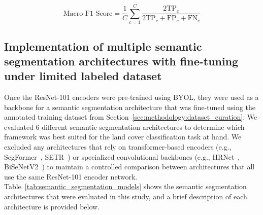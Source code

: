 \begin{equation}\label{eq:macro_f1}
    \text{Macro F1 Score} = \frac{1}{C} \sum_{c=1}^{C} \frac{2\text{TP}_c}{2\text{TP}_c + \text{FP}_c + \text{FN}_c}
\end{equation}

% 

\subsection{Implementation of multiple semantic segmentation architectures with fine-tuning under limited labeled dataset}\label{sec:methodology:semantic_segmentation}

Once the ResNet-101 encoders were pre-trained using BYOL, they were used as a backbone for a semantic segmentation architecture that was fine-tuned using the annotated training dataset from Section~\ref{sec:methodology:dataset_curation}.
We evaluated 6 different semantic segmentation architectures to determine which framework was best suited for the land cover classification task at hand.
We excluded any architectures that rely on transformer-based encoders (e.g., SegFormer~\citep{xieSegFormerSimpleEfficient2021}, SETR~\citep{zhengRethinkingSemanticSegmentation2021}) or specialized convolutional backbones (e.g., HRNet~\citep{wangDeepHighResolutionRepresentation2020}, BiSeNetV2~\citep{yuBiSeNetV2Bilateral2021}) to maintain a controlled comparison between architectures that all use the same ResNet-101 encoder network.
Table~\ref{tab:semantic_segmentation_models} shows the semantic segmentation architectures that were evaluated in this study, and a brief description of each architecture is provided below.



